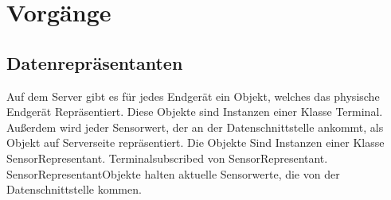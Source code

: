 \documentclass[pflichtenheft.tex]{subfiles}
\begin{document}
\chapter{Vorgänge}
\section{Datenrepräsentanten}

Auf dem Server gibt es für jedes Endgerät ein Objekt, welches das physische Endgerät Repräsentiert. Diese Objekte sind Instanzen einer Klasse \glq Terminal\grq. Außerdem wird jeder Sensorwert, der an der Datenschnittstelle ankommt, als Objekt auf Serverseite repräsentiert. Die Objekte Sind Instanzen einer Klasse \glq SensorRepresentant\grq. \glq Terminal\grq subscribed von \glq SensorRepresentant\grq. \glq SensorRepresentant\grq Objekte halten aktuelle Sensorwerte, die von der Datenschnittstelle kommen.
\end{document}
